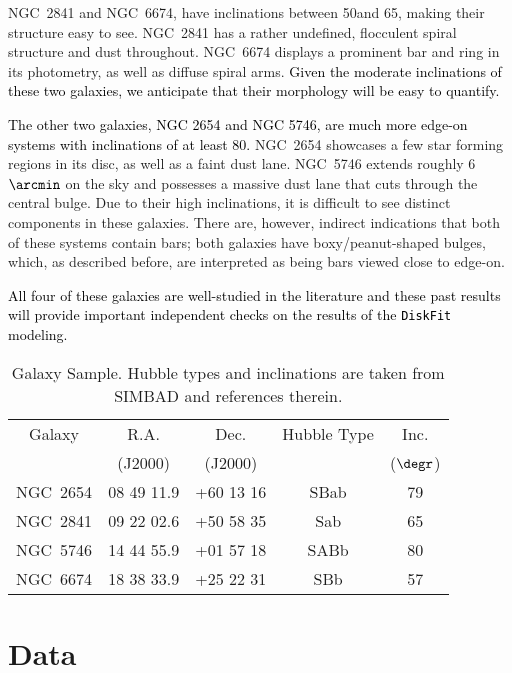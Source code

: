 \documentclass[a4paper,fleqn,usenatbib]{mnras}
\newcommand{\authorfix}{\textcolor{black}}
\begin{document}
NGC~2841 and NGC~6674, have inclinations between 50\degr and 65\degr, making their structure easy to see. NGC~2841 has a rather undefined, flocculent spiral structure and dust throughout.  NGC~6674 displays a prominent bar and ring in its photometry, as well as diffuse spiral arms. \authorfix{Given the moderate inclinations of these two galaxies, we anticipate that their morphology will be easy to quantify.}

\authorfix{The other two galaxies, NGC 2654 and NGC 5746, are much more edge-on systems with inclinations of at least 80\degr.} NGC~2654 showcases a few star forming regions in its disc, as well as a faint dust lane. NGC~5746 extends roughly 6$\arcmin$ on the sky and possesses a massive dust lane that cuts through the central bulge. Due to their high inclinations, it is difficult to see distinct components in these galaxies. There are, however, indirect indications that both of these systems contain bars; both galaxies have boxy/peanut-shaped bulges, which, as described before, are interpreted as being bars viewed close to edge-on.

\authorfix{All four of these galaxies are well-studied in the literature and these past results will provide important independent checks on the results of the \texttt{DiskFit} modeling.}

\begin{table}
	\centering
	\caption{Galaxy Sample.  Hubble types and inclinations are taken from SIMBAD \citep{wenger2000} and references therein.}
  	\label{gal_info}
	\begin{tabular}{ccccc}
 	\hline
   	Galaxy 	& R.A. 	& Dec.  	& Hubble Type 	& Inc. \\
    			& (J2000)	& (J2000)	&                       & ($\degr$)\\
  	\hline
  	NGC~2654 & 08 49 11.9 & +60 13 16 & SBab & 79 \\
  	NGC~2841 & 09 22 02.6 & +50 58 35 & Sab & 65 \\ 
  	NGC~5746 & 14 44 55.9 & +01 57 18 & SABb & 80 \\  
  	NGC~6674 & 18 38 33.9 & +25 22 31 & SBb & 57\\
	\hline
	\end{tabular}
\end{table}

\section{Data}
\label{sec:data}
\end{document}
